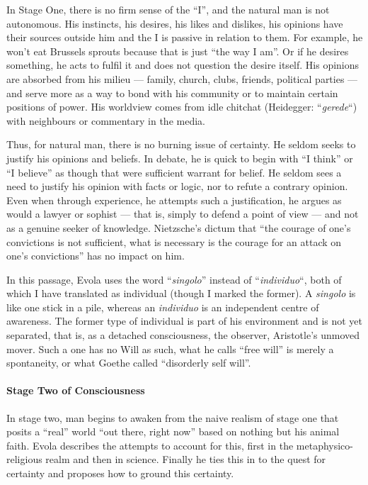 In Stage One, there is no firm sense of the ``I'', and the natural man is not autonomous. His instincts, his desires, his likes and dislikes, his opinions have their sources outside him and the I is passive in relation to them. For example, he won't eat Brussels sprouts because that is just ``the way I am''. Or if he desires something, he acts to fulfil it and does not question the desire itself. His opinions are absorbed from his milieu --- family, church, clubs, friends, political parties --- and serve more as a way to bond with his community or to maintain certain positions of power. His worldview comes from idle chitchat (Heidegger: ``\emph{gerede}``) with neighbours or commentary in the media.

Thus, for natural man, there is no burning issue of certainty. He seldom seeks to justify his opinions and beliefs. In debate, he is quick to begin with ``I think'' or ``I believe'' as though that were sufficient warrant for belief. He seldom sees a need to justify his opinion with facts or logic, nor to refute a contrary opinion. Even when through experience, he attempts such a justification, he argues as would a lawyer or sophist --- that is, simply to defend a point of view --- and not as a genuine seeker of knowledge. Nietzsche's dictum that ``the courage of one's convictions is not sufficient, what is necessary is the courage for an attack on one's convictions'' has no impact on him.

In this passage, Evola uses the word ``\emph{singolo}'' instead of ``\emph{individuo}``, both of which I have translated as individual (though I marked the former). A \emph{singolo} is like one stick in a pile, whereas an \emph{individuo} is an independent centre of awareness. The former type of individual is part of his environment and is not yet separated, that is, as a detached consciousness, the observer, Aristotle's unmoved mover. Such a one has no Will as such, what he calls ``free will'' is merely a spontaneity, or what Goethe called ``disorderly self will''.

\paragraph{Stage Two of Consciousness}


In stage two, man begins to awaken from the naive realism of stage one that posits a ``real'' world ``out there, right now'' based on nothing but his animal faith. Evola describes the attempts to account for this, first in the metaphysico-religious realm and then in science. Finally he ties this in to the quest for certainty and proposes how to ground this certainty.

